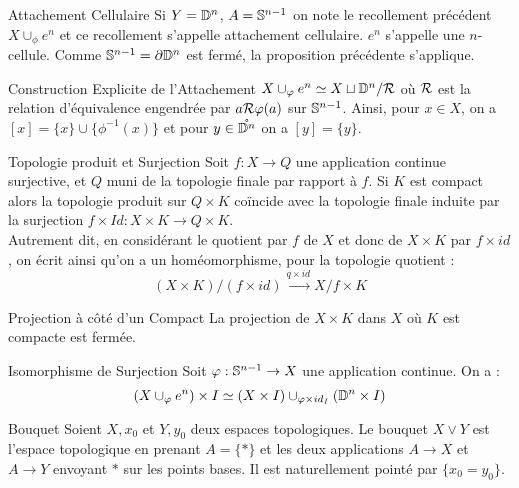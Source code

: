 \documentclass{cours}
\begin{document}
\begin{définition}{Attachement Cellulaire}{}
    Si $Y = \D^{n}$, $A = \S^{n-1}$ on note le recollement précédent $X \cup_{\phi} e^{n}$ et ce recollement s'appelle attachement cellulaire. $e^{n}$ s'appelle une $n$-cellule. Comme $\S^{n -1} = \partial\D^{n}$ est fermé, la proposition précédente s'applique. 
\end{définition}

\begin{remarque}{Construction Explicite de l'Attachement}{}
    $X \cup_{\phi} e^{n} \simeq X \sqcup \D^{n}/\mathcal{R}$ où $\mR$ est la relation d'équivalence engendrée par $a \mR \phi(a)$ sur $\S^{n-1}$. Ainsi, pour $x \in X$, on a $[x] = \{x\}\cup \{\phi^{-1}(x)\}$ et pour $y \in \mathring{\D^{n}}$ on a $[y] = \{y\}$.
\end{remarque}

\begin{propositionfr}{Topologie produit et Surjection}{}
    Soit $f : X \to Q$ une application continue surjective, et $Q$ muni de la topologie finale par rapport à $f$. Si $K$ est compact alors la topologie produit sur $Q \times K$ coïncide avec la topologie finale induite par la surjection $f \times Id : X \times K \to Q \times K$. \\
    Autrement dit, en considérant le quotient par $f$ de $X$ et donc de $X \times K$ par $f \times id$, on écrit ainsi qu'on a un homéomorphisme, pour la topologie quotient : 
    \[
        (X \times K)/(f \times id) \xrightarrow{q \times id} X/f \times K
    \]
\end{propositionfr}

\begin{lemme}{Projection à côté d'un Compact}{}
    La projection de $X \times K$ dans $X$ où $K$ est compacte est fermée.
\end{lemme}

\begin{corollaire}{Isomorphisme de Surjection}{}
    Soit $\phi : \S^{n-1} \to X$ une application continue. On a : 
    \[
        \left(X \cup_{\phi} e^{n}\right) \times I \simeq \left(X \times I\right) \cup_{\phi \times id_{I}} \left(\D^{n} \times I\right)
    \]
\end{corollaire}

\begin{définition}{Bouquet}{}
    Soient $X, x_{0}$ et $Y, y_{0}$ deux espaces topologiques. Le bouquet $X \lor Y$ est l'espace topologique en prenant $A = \{*\}$ et les deux applications $A\to X$ et $A\to Y$ envoyant $*$ sur les points bases. Il est naturellement pointé par $\{x_{0} = y_{0}\}$.
\end{définition}
\end{document}

